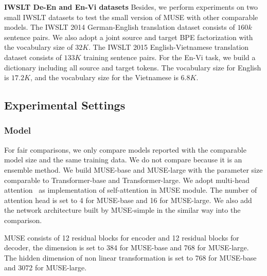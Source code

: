 \documentclass{article} %
\begin{document}
\textbf{IWSLT De-En and En-Vi datasets} Besides, we perform experiments on two small IWSLT datasets to test the small version of MUSE with other comparable models. The IWSLT 2014 German-English translation dataset consists of $160k$ sentence pairs. We also adopt a joint source and target BPE factorization with the vocabulary size of $32K$. The IWSLT 2015 English-Vietnamese translation dataset consists of $133K$ training sentence pairs. For the En-Vi task, we build a dictionary including all source and target tokens. The vocabulary size for English is $17.2K$, and the vocabulary size for the Vietnamese is $6.8K$. 


\subsection{Experimental Settings}
\subsubsection{Model}
For fair comparisons, we only compare models reported with the comparable model size and the same training data. We do not compare \citet{Wu_2019} because it is an  ensemble method. We build MUSE-base and MUSE-large with the parameter size  comparable to Transformer-base and Transformer-large. We adopt multi-head attention~\citep{vaswani2017attention} as implementation of self-attention in MUSE module. The number of attention head is set to 4 for MUSE-base and 16 for MUSE-large. We also add the network architecture built by MUSE-simple  in the similar way into the comparison.

MUSE consists of 12 residual blocks for encoder and 12 residual blocks for decoder, the dimension is set to 384 for MUSE-base and 768 for MUSE-large. The hidden dimension of non linear transformation is set to 768 for MUSE-base and 3072 for MUSE-large.
\end{document}

